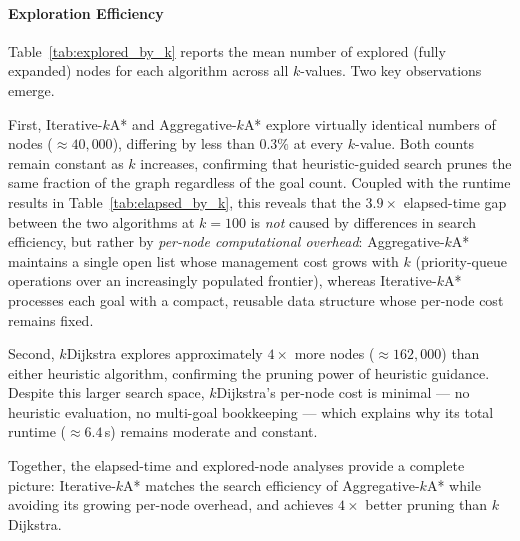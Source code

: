 
\paragraph{Exploration Efficiency}
Table~\ref{tab:explored_by_k} reports the mean number of explored
(fully expanded) nodes for each algorithm across all $k$-values.
Two key observations emerge.

First, Iterative-$k$A* and Aggregative-$k$A* explore virtually
identical numbers of nodes (${\approx}40{,}000$), differing by less
than $0.3\%$ at every $k$-value. Both counts remain constant as $k$
increases, confirming that heuristic-guided search prunes the same
fraction of the graph regardless of the goal count. Coupled with the
runtime results in Table~\ref{tab:elapsed_by_k}, this reveals that
the $3.9{\times}$ elapsed-time gap between the two algorithms at
$k{=}100$ is \emph{not} caused by differences in search
efficiency, but rather by \emph{per-node computational overhead}:
Aggregative-$k$A* maintains a single open list whose management cost
grows with $k$ (priority-queue operations over an increasingly
populated frontier), whereas Iterative-$k$A* processes each goal
with a compact, reusable data structure whose per-node cost remains
fixed.

Second, $k$Dijkstra explores approximately $4{\times}$ more nodes
(${\approx}162{,}000$) than either heuristic algorithm, confirming
the pruning power of heuristic guidance. Despite this larger search
space, $k$Dijkstra's per-node cost is minimal --- no heuristic
evaluation, no multi-goal bookkeeping --- which explains why its
total runtime (${\approx}6.4$\,s) remains moderate and constant.

Together, the elapsed-time and explored-node analyses provide a
complete picture: Iterative-$k$A* matches the search efficiency of
Aggregative-$k$A* while avoiding its growing per-node overhead,
and achieves $4{\times}$ better pruning than $k$Dijkstra.
